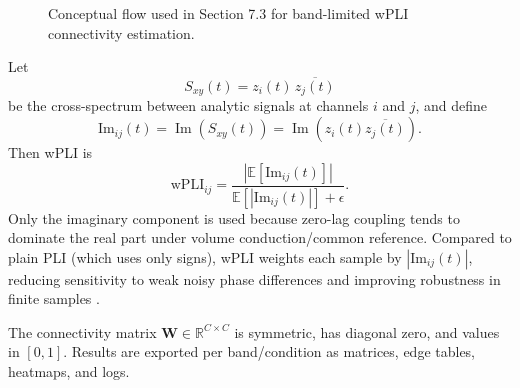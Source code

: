 \begin{figure}[H]
\centering
{}
\caption{Conceptual flow used in Section 7.3 for band-limited wPLI connectivity estimation.}
\end{figure}

Let
\[
S_{xy}(t)=z_i(t)\,\overline{z_j(t)}
\]
be the cross-spectrum between analytic signals at channels $i$ and $j$, and define
\[
\mathrm{Im}_{ij}(t)=\operatorname{Im}\!\left(S_{xy}(t)\right)=\operatorname{Im}\!\left(z_i(t)\overline{z_j(t)}\right).
\]
Then wPLI is
\[
\mathrm{wPLI}_{ij}
=
\frac{\left|\mathbb{E}\left[\mathrm{Im}_{ij}(t)\right]\right|}
{\mathbb{E}\left[\left|\mathrm{Im}_{ij}(t)\right|\right]+\epsilon}.
\]
Only the imaginary component is used because zero-lag coupling tends to dominate the real part under volume conduction/common reference. Compared to plain PLI (which uses only signs), wPLI weights each sample by $|\mathrm{Im}_{ij}(t)|$, reducing sensitivity to weak noisy phase differences and improving robustness in finite samples \citep{Vinck2011WPLI}.

The connectivity matrix $\mathbf{W}\in\mathbb{R}^{C\times C}$ is symmetric, has diagonal zero, and values in $[0,1]$. Results are exported per band/condition as matrices, edge tables, heatmaps, and logs.

